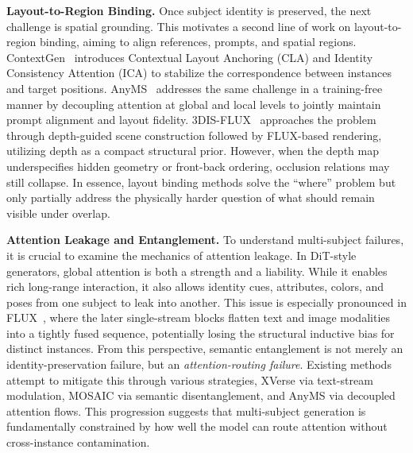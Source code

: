 \textbf{Layout-to-Region Binding.} 
Once subject identity is preserved, the next challenge is spatial grounding. This motivates a second line of work on layout-to-region binding, aiming to align references, prompts, and spatial regions. ContextGen~\cite{contextgen2024} introduces Contextual Layout Anchoring (CLA) and Identity Consistency Attention (ICA) to stabilize the correspondence between instances and target positions. AnyMS~\cite{anyms2024} addresses the same challenge in a training-free manner by decoupling attention at global and local levels to jointly maintain prompt alignment and layout fidelity. 3DIS-FLUX~\cite{3disflux2024} approaches the problem through depth-guided scene construction followed by FLUX-based rendering, utilizing depth as a compact structural prior. However, when the depth map underspecifies hidden geometry or front-back ordering, occlusion relations may still collapse. In essence, layout binding methods solve the ``where'' problem but only partially address the physically harder question of what should remain visible under overlap.

\textbf{Attention Leakage and Entanglement.} 
To understand multi-subject failures, it is crucial to examine the mechanics of attention leakage. In DiT-style generators, global attention is both a strength and a liability. While it enables rich long-range interaction, it also allows identity cues, attributes, colors, and poses from one subject to leak into another. This issue is especially pronounced in FLUX~\cite{labs2025flux1kontextflowmatching}, where the later single-stream blocks flatten text and image modalities into a tightly fused sequence, potentially losing the structural inductive bias for distinct instances. From this perspective, semantic entanglement is not merely an identity-preservation failure, but an \textit{attention-routing failure}. Existing methods attempt to mitigate this through various strategies, XVerse via text-stream modulation, MOSAIC via semantic disentanglement, and AnyMS via decoupled attention flows. This progression suggests that multi-subject generation is fundamentally constrained by how well the model can route attention without cross-instance contamination.

